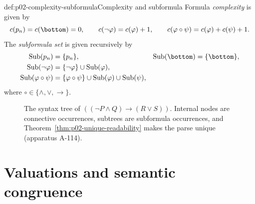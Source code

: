 \begin{hbdefinition}{def:p02-complexity-subformula}{Complexity and subformula}
Formula \emph{complexity} is given by
\[
 c(p_n)=c(\bottom)=0,\qquad
 c(\neg\varphi)=c(\varphi)+1,\qquad
 c(\varphi\circ\psi)=c(\varphi)+c(\psi)+1.
\]
The \emph{subformula set} is given recursively by
\[
\begin{aligned}
 \operatorname{Sub}(p_n)&=\{p_n\},&
 \operatorname{Sub}(\bottom)&=\{\bottom\},\\
 \operatorname{Sub}(\neg\varphi)&=\{\neg\varphi\}\cup
   \operatorname{Sub}(\varphi),\\
 \operatorname{Sub}(\varphi\circ\psi)&=\{\varphi\circ\psi\}\cup
   \operatorname{Sub}(\varphi)\cup\operatorname{Sub}(\psi),
\end{aligned}
\]
where \(\circ\in\{\land,\lor,\to\}\).
\end{hbdefinition}

\begin{figure}[tp]
\centering
{}
\caption{The syntax tree of
\(((\neg P\land Q)\to(R\lor S))\).  Internal nodes are connective
occurrences, subtrees are subformula occurrences, and
Theorem~\ref{thm:p02-unique-readability} makes the parse unique
(apparatus A-114).}
\label{fig:p02-formula-syntax-tree}
\end{figure}

\section{Valuations and semantic congruence}
\label{sec:p02-propositional-semantics}

